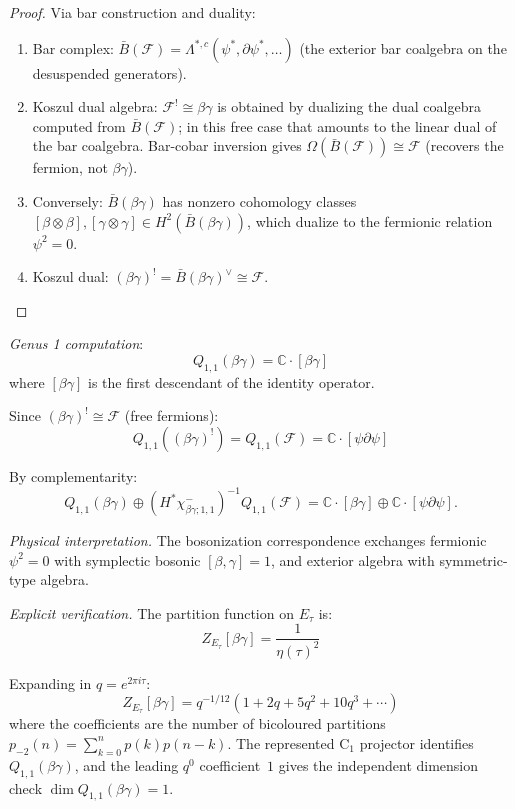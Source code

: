 \begin{example}
\begin{proof}
Via bar construction and duality:
\begin{enumerate}
\item Bar complex: $\bar{B}(\mathcal{F}) = \Lambda^{*,c}(\psi^*, \partial\psi^*, \ldots)$ (the exterior bar coalgebra on the desuspended generators).
\item Koszul dual algebra: $\mathcal{F}^! \cong \beta\gamma$ is obtained by dualizing the dual coalgebra computed from $\bar{B}(\mathcal{F})$; in this free case that amounts to the linear dual of the bar coalgebra. Bar-cobar inversion gives $\Omega(\bar{B}(\mathcal{F})) \cong \mathcal{F}$ (recovers the fermion, not $\beta\gamma$).
\item Conversely: $\bar{B}(\beta\gamma)$ has nonzero cohomology classes $[\beta \otimes \beta], [\gamma \otimes \gamma] \in H^2(\bar{B}(\beta\gamma))$, which dualize to the fermionic relation $\psi^2 = 0$.
\item Koszul dual: $(\beta\gamma)^! = \bar{B}(\beta\gamma)^\vee \cong \mathcal{F}$.
\end{enumerate}
\end{proof}

\emph{Genus 1 computation}:
\begin{equation}
Q_{1,1}(\beta\gamma) = \mathbb{C} \cdot [\beta\gamma]
\end{equation}
where $[\beta\gamma]$ is the first descendant of the identity operator.

Since $(\beta\gamma)^! \cong \mathcal{F}$ (free fermions):
\begin{equation}
Q_{1,1}((\beta\gamma)^!) = Q_{1,1}(\mathcal{F}) = \mathbb{C} \cdot [\psi \partial\psi]
\end{equation}

By complementarity:
\begin{equation}
Q_{1,1}(\beta\gamma)\oplus
(H^*\chi^-_{\beta\gamma;1,1})^{-1}Q_{1,1}(\mathcal F)
=\mathbb C\cdot[\beta\gamma]\oplus
\mathbb C\cdot[\psi\partial\psi].
\end{equation}

\emph{Physical interpretation.} The bosonization correspondence exchanges fermionic $\psi^2 = 0$ with symplectic bosonic $[\beta,\gamma] = 1$, and exterior algebra with symmetric-type algebra.

\emph{Explicit verification.} The partition function on $E_\tau$ is:
\begin{equation}
Z_{E_\tau}[\beta\gamma] = \frac{1}{\eta(\tau)^2}
\end{equation}

Expanding in $q = e^{2\pi i \tau}$:
\begin{equation}
Z_{E_\tau}[\beta\gamma] = q^{-1/12} (1 + 2q + 5q^2 + 10q^3 + \cdots)
\end{equation}
where the coefficients are the number of bicoloured partitions
$p_{-2}(n) = \sum_{k=0}^n p(k)p(n-k)$.
The represented \(\mathrm C_1\) projector identifies
$Q_{1,1}(\beta\gamma)$, and the leading $q^0$ coefficient~$1$ gives
the independent dimension check
$\dim Q_{1,1}(\beta\gamma)=1$.
\end{example}

